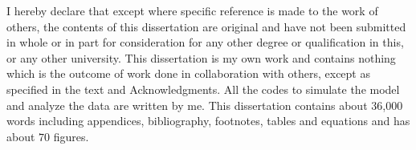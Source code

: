 
\begin{declaration}

I hereby declare that except where specific reference is made to the work of 
others, the contents of this dissertation are original and have not been 
submitted in whole or in part for consideration for any other degree or 
qualification in this, or any other university. This dissertation is my own 
work and contains nothing which is the outcome of work done in collaboration 
with others, except as specified in the text and Acknowledgments. All the codes to simulate the model and analyze the data are written by me. 
This dissertation contains about 36,000 words including appendices, 
bibliography, footnotes, tables and equations and has about $70$ figures.


\end{declaration}